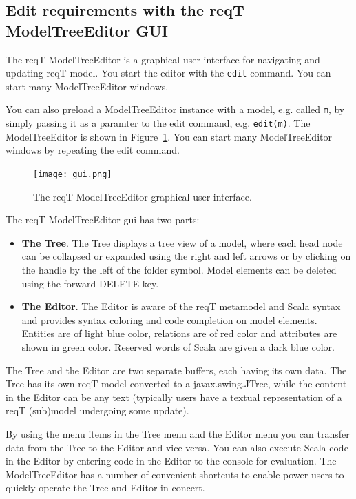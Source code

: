 \documentclass[11pt]{article}
\begin{document}
\subsection{Edit requirements with the reqT ModelTreeEditor GUI}

The reqT ModelTreeEditor is a graphical user interface for navigating and updating reqT model. You start the editor with the \verb+edit+ command. You can start many ModelTreeEditor windows. 

You can also preload a ModelTreeEditor instance with a model, e.g. called \verb+m+, by simply passing it as a paramter to the edit command, e.g. \verb+edit(m)+. The ModelTreeEditor is shown in Figure~\ref{fig:gui}. You can start many ModelTreeEditor windows by repeating the edit command.

\begin{figure}[ht]
    \centering
    \texttt{[image: gui.png]}
    \caption{The reqT ModelTreeEditor graphical user interface.}
    \label{fig:gui}
\end{figure}

The reqT ModelTreeEditor gui has two parts:
\begin{itemize}
\item {\bf The Tree}. The Tree displays a tree view of a model, where each head node can be collapsed or expanded using the right and left arrows or by clicking on the handle by the left of the folder symbol. Model elements can be deleted using the forward DELETE key.
\item {\bf The Editor}. The Editor is aware of the reqT metamodel and Scala syntax and provides syntax coloring and code completion on model elements. Entities are of light blue color, relations are of red color and attributes are shown in green color. Reserved words of Scala are given a dark blue color.
\end{itemize}

The Tree and the Editor are two separate buffers, each having its own data. The Tree has its own reqT model converted to a javax.swing.JTree, while the content in the Editor can be any text (typically users have a textual representation of a reqT (sub)model undergoing  some update). 

By using the menu items in the Tree menu and the Editor menu you can transfer data from the Tree to the Editor and vice versa. You can also execute Scala code in the Editor by entering code in the Editor to the console for evaluation. The ModelTreeEditor has a number of convenient shortcuts to enable power users to quickly operate the Tree and Editor in concert.
\end{document}
